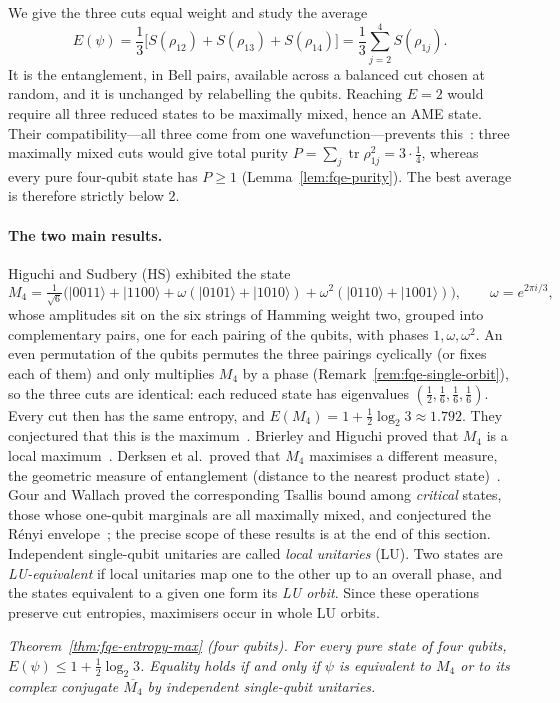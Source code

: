 \documentclass[11pt]{article}
\begin{document}
We give the three cuts equal weight and study the average
\[
E(\psi)=\frac13\bigl[S(\rho_{12})+S(\rho_{13})+S(\rho_{14})\bigr]
       =\frac13\sum_{j=2}^{4}S(\rho_{1j}).
\]
It is the entanglement, in Bell pairs, available across a balanced cut chosen at random, and it is unchanged by
relabelling the qubits. Reaching $E=2$ would require all three reduced states to be
maximally mixed, hence an AME state. Their compatibility---all three come from one wavefunction---prevents
this~\cite{HS}: three maximally mixed cuts would give total purity $P=\sum_j\operatorname{tr}\rho_{1j}^2=3\cdot\tfrac14$,
whereas every pure four-qubit state has $P\ge1$ (Lemma~\ref{lem:fqe-purity}). The best average is
therefore strictly below $2$.

\paragraph{The two main results.} Higuchi and Sudbery (HS) exhibited the state
\[
M_4=\tfrac1{\sqrt6}\bigl(|0011\rangle+|1100\rangle+\omega(|0101\rangle+|1010\rangle)
+\omega^2(|0110\rangle+|1001\rangle)\bigr),\qquad\omega=e^{2\pi i/3},
\]
whose amplitudes sit on the six strings of Hamming weight two, grouped into complementary pairs, one for each
pairing of the qubits, with phases $1,\omega,\omega^2$. An even permutation of the qubits permutes the three pairings
cyclically (or fixes each of them) and only multiplies $M_4$ by a phase (Remark~\ref{rem:fqe-single-orbit}), so the three cuts are
identical: each reduced state has eigenvalues
$(\tfrac12,\tfrac16,\tfrac16,\tfrac16)$. Every cut then has the same entropy, and
$E(M_4)=1+\tfrac12\log_2 3\approx1.792$. They conjectured that this is the maximum~\cite{HS}. Brierley and Higuchi
proved that $M_4$ is a local maximum~\cite{BH}. Derksen et al.\ proved that $M_4$ maximises a different measure, the
geometric measure of entanglement (distance to the nearest product state)~\cite{DFLW}. Gour and Wallach proved the corresponding Tsallis bound among
\emph{critical} states, those whose one-qubit marginals are all maximally mixed, and conjectured the R\'enyi envelope~\cite{GW}; the precise scope of these results is at the end of this section.
Independent single-qubit unitaries are called \emph{local unitaries} (LU). Two states are \emph{LU-equivalent} if
local unitaries map one to the other up to an overall phase, and the states equivalent to a given one form its
\emph{LU orbit}. Since these operations preserve cut entropies, maximisers occur in whole LU orbits.

\medskip\noindent\emph{Theorem~\ref{thm:fqe-entropy-max} (four qubits). For every pure state of four
qubits, $E(\psi)\le1+\tfrac12\log_2 3$. Equality holds if and only if $\psi$ is equivalent to $M_4$ or
to its complex conjugate $\overline{M_4}$ by independent single-qubit unitaries.}
\medskip
\end{document}
